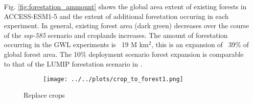 \documentclass[]{article}
\begin{document}
Fig. \ref{fig:forestation_ammount} shows the global area extent of existing forests in ACCESS-ESM1-5 and the extent of additional forestation occuring in each experiment.
In general, existing forest area (dark green) decreases over the course of the \textit{ssp-585} scenario and croplands increases.
The amount of forestation occurring in the GWL experiments is ~19 M km$^2$, this is an expansion of ~39\% of global forest area.
The 10\% deployment scenario forest expansion is comparable to that of the LUMIP forestation scenario in \cite{loughran_limited_2023}.

\begin{figure}[H]
    \begin{subfigure}[b]{\linewidth}
        \centering
        \texttt{[image: ../../plots/crop\_to\_forest1.png]}
    \end{subfigure}
    \caption{Replace crops}
    \label{fig:to_forest}
\end{figure}
\end{document}

